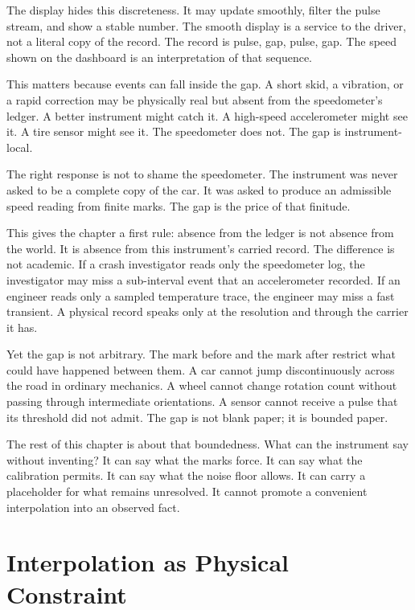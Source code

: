 The display hides this discreteness. It may update smoothly, filter the pulse
stream, and show a stable number. The smooth display is a service to the driver,
not a literal copy of the record. The record is pulse, gap, pulse, gap. The
speed shown on the dashboard is an interpretation of that sequence.

This matters because events can fall inside the gap. A short skid, a vibration,
or a rapid correction may be physically real but absent from the speedometer's
ledger. A better instrument might catch it. A high-speed accelerometer might
see it. A tire sensor might see it. The speedometer does not. The gap is
instrument-local.

The right response is not to shame the speedometer. The instrument was never
asked to be a complete copy of the car. It was asked to produce an admissible
speed reading from finite marks. The gap is the price of that finitude.

This gives the chapter a first rule: absence from the ledger is not absence
from the world. It is absence from this instrument's carried record. The
difference is not academic. If a crash investigator reads only the speedometer
log, the investigator may miss a sub-interval event that an accelerometer
recorded. If an engineer reads only a sampled temperature trace, the engineer
may miss a fast transient. A physical record speaks only at the resolution and
through the carrier it has.

Yet the gap is not arbitrary. The mark before and the mark after restrict what
could have happened between them. A car cannot jump discontinuously across the
road in ordinary mechanics. A wheel cannot change rotation count without
passing through intermediate orientations. A sensor cannot receive a pulse that
its threshold did not admit. The gap is not blank paper; it is bounded paper.

The rest of this chapter is about that boundedness. What can the instrument say
without inventing? It can say what the marks force. It can say what the
calibration permits. It can say what the noise floor allows. It can carry a
placeholder for what remains unresolved. It cannot promote a convenient
interpolation into an observed fact.

\section{Interpolation as Physical Constraint}
\label{se:interpolation-as-physical-constraint}

